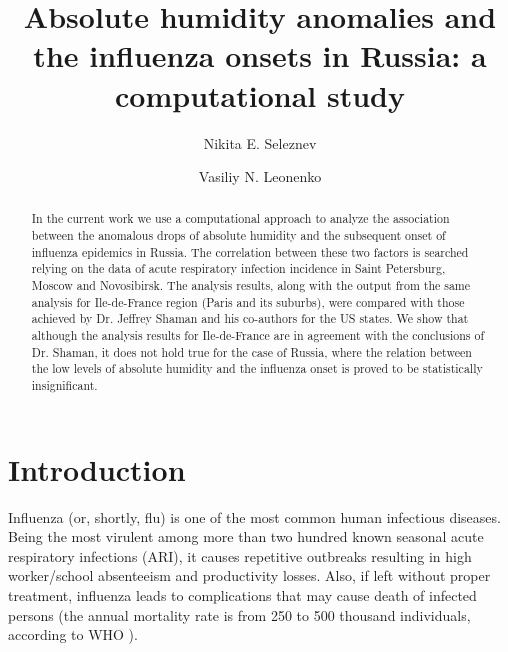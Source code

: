 \documentclass[procedia]{easychair}
\title{Absolute humidity anomalies and the influenza onsets in Russia: a computational study}
\author{
    Nikita E. Seleznev\inst{1}
\and
    Vasiliy N. Leonenko\inst{2}
}
\institute{
  ITMO University,
  Saint-Petersburg, Russia\\
  \email{ne.seleznev@gmail.com}
\and
   ITMO University,
   Saint-Petersburg, Russia\\
   \email{vnleonenko@yandex.ru}\\
 }
\begin{document}
\maketitle


\begin{abstract}
In the current work we use a computational approach to analyze the association between the anomalous drops of absolute humidity and the subsequent onset of influenza epidemics in Russia. The correlation between these two factors is searched relying on the data of acute respiratory infection incidence in Saint Petersburg, Moscow and Novosibirsk. The analysis results, along with the output from the same analysis for Ile-de-France region (Paris and its suburbs), were compared with those achieved by Dr. Jeffrey Shaman and his co-authors for the US states. We show that although the analysis results for Ile-de-France are in agreement with the conclusions of Dr. Shaman, it does not hold true for the case of Russia, where the relation between the low levels of absolute humidity and the influenza onset is proved to be statistically insignificant.
\end{abstract}


%
%


\section{Introduction}
\label{sect:introduction}

Influenza (or, shortly, flu) is one of the most common human infectious diseases. Being the most virulent among more than two hundred known seasonal acute respiratory infections (ARI), it causes repetitive outbreaks resulting in high worker/school absenteeism and productivity losses. Also, if left without proper treatment, influenza leads to complications that may cause death of infected persons (the annual mortality rate is from 250 to 500 thousand individuals, according to WHO \cite{who_flu_facts}). 
\end{document}
